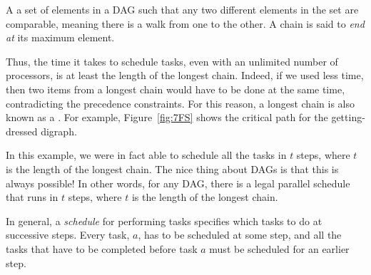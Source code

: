\begin{definition}
A  a set of elements in a DAG such that any two different
elements in the set are comparable, meaning there is a walk from one
to the other.  A chain is said to \emph{end at}
its maximum element.
\end{definition}

Thus, the time it takes to schedule tasks, even with an unlimited
number of processors, is at least the length of the longest chain.
Indeed, if we used less time, then two items from a longest chain
would have to be done at the same time, contradicting the precedence
constraints.  For this reason, a longest chain is also known as a
.  For example, Figure~\ref{fig:7FS} shows the
critical path for the getting-dressed digraph.

In this example, we were in fact able to schedule all the tasks in $t$
steps, where $t$ is the length of the longest chain.  The nice
thing about DAGs is that this is always possible!  In other words,
for any DAG, there is a legal parallel schedule that runs in $t$
steps, where $t$ is the length of the longest chain.

In general, a \emph{schedule} for performing tasks specifies which
tasks to do at successive steps.  Every task, $a$, has to be scheduled
at some step, and all the tasks that have to be completed before task
$a$ must be scheduled for an earlier step.


